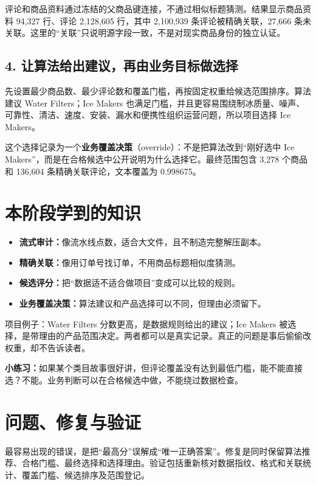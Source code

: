 评论和商品资料通过冻结的父商品键连接，不通过相似标题猜测。结果显示商品资料 94,327 行、评论 2,128,605 行，其中 2,100,939 条评论被精确关联，27,666 条未关联。这里的“关联”只说明源字段一致，不是对现实商品身份的独立认证。

\subsection{4. 让算法给出建议，再由业务目标做选择}

先设置最少商品数、最少评论数和覆盖门槛，再按固定权重给候选范围排序。算法建议 Water Filters；Ice Makers 也满足门槛，并且更容易围绕制冰质量、噪声、可靠性、清洁、速度、安装、漏水和便携性组织运营问题，所以项目选择 Ice Makers。

这个选择记录为一个\textbf{业务覆盖决策}（override）：不是把算法改到“刚好选中 Ice Makers”，而是在合格候选中公开说明为什么选择它。最终范围包含 3,278 个商品和 136,604 条精确关联评论，文本覆盖为 0.998675。

\section{本阶段学到的知识}

\begin{itemize}
  \item \textbf{流式审计：}像流水线点数，适合大文件，且不制造完整解压副本。
  \item \textbf{精确关联：}像用订单号找订单，不用商品标题相似度猜测。
  \item \textbf{候选评分：}把“数据适不适合做项目”变成可以比较的规则。
  \item \textbf{业务覆盖决策：}算法建议和产品选择可以不同，但理由必须留下。
\end{itemize}

\begin{beginnerbox}
项目例子：Water Filters 分数更高，是数据规则给出的建议；Ice Makers 被选择，是带理由的产品范围决定。两者都可以是真实记录。真正的问题是事后偷偷改权重，却不告诉读者。
\end{beginnerbox}

\textbf{小练习：}如果某个类目故事很好讲，但评论覆盖没有达到最低门槛，能不能直接选？不能。业务判断可以在合格候选中做，不能绕过数据检查。

\section{问题、修复与验证}

最容易出现的错误，是把“最高分”误解成“唯一正确答案”。修复是同时保留算法推荐、合格门槛、最终选择和选择理由。验证包括重新核对数据指纹、格式和关联统计、覆盖门槛、候选排序及范围登记。

